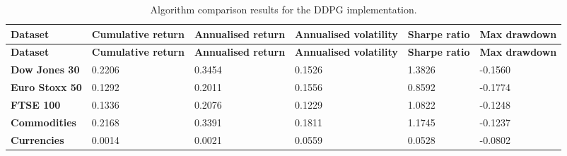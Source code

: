 \begin{longtable}{|l|p{2.1cm}|p{2.1cm}|p{2.1cm}|p{1.5cm}|p{2cm}|}
    \caption{Algorithm comparison results for the DDPG implementation.}
    \label{tab:experiment_algorithms_ddpg}
    \\ 
    \hline
    \textbf{Dataset} & \textbf{Cumulative return} & \textbf{Annualised return} & \textbf{Annualised volatility} & \textbf{Sharpe ratio} & \textbf{Max drawdown}  \\ \midrule
    \endfirsthead

    \hline
    \textbf{Dataset} & \textbf{Cumulative return} & \textbf{Annualised return} & \textbf{Annualised volatility} & \textbf{Sharpe ratio} & \textbf{Max drawdown}  \\ \midrule
    \endhead

    \endfoot
    \hline

    \textbf{Dow Jones 30} & 0.2206 & 0.3454 & 0.1526 & 1.3826 & -0.1560 \\ \hline
    \textbf{Euro Stoxx 50} & 0.1292 & 0.2011 & 0.1556 & 0.8592 & -0.1774 \\ \hline
    \textbf{FTSE 100} & 0.1336 & 0.2076 & 0.1229 & 1.0822 & -0.1248 \\ \hline
    \textbf{Commodities} & 0.2168 & 0.3391 & 0.1811 & 1.1745 & -0.1237 \\ \hline
    \textbf{Currencies} & 0.0014 & 0.0021 & 0.0559 & 0.0528 & -0.0802 \\ \hline
\end{longtable}